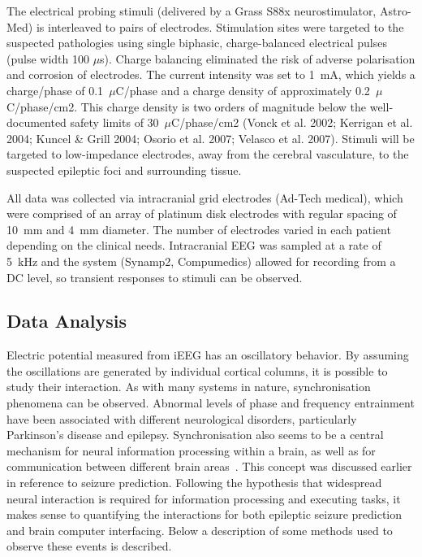 \documentclass[]{article}
\begin{document}
The electrical probing stimuli (delivered by a Grass S88x neurostimulator, Astro-Med) is interleaved to pairs of electrodes. Stimulation sites were targeted to the suspected pathologies using single biphasic, charge-balanced electrical pulses (pulse width 100 $\mu$s). Charge balancing eliminated the risk of adverse polarisation and corrosion of electrodes. The current intensity was set to 1~mA, which yields a charge/phase of 0.1~$\mu$C/phase and a charge density of approximately 0.2~$\mu$C/phase/cm2. This charge density is two orders of magnitude below the well-documented safety limits of 30~$\mu$C/phase/cm2 (Vonck et al. 2002; Kerrigan et al. 2004; Kuncel \& Grill 2004; Osorio et al. 2007; Velasco et al. 2007). Stimuli will be targeted to low-impedance electrodes, away from the cerebral vasculature, to the suspected epileptic foci and surrounding tissue.

All data was collected via intracranial grid electrodes (Ad-Tech medical), which were comprised of an array of platinum disk electrodes with regular spacing of 10~mm and 4~mm diameter. The number of electrodes varied in each patient depending on the clinical needs. Intracranial EEG was sampled at a rate of 5~kHz and the system (Synamp2, Compumedics) allowed for recording from a DC level, so transient responses to stimuli can be observed.
\subsection{Data Analysis}
Electric potential measured from iEEG has
an oscillatory behavior. By assuming the oscillations are generated
by individual cortical columns, it is possible to study their
interaction. As with many systems in nature, synchronisation
phenomena can be observed. Abnormal levels of phase and frequency
entrainment have been associated with different neurological
disorders, particularly Parkinson's disease and epilepsy.
Synchronisation also seems to be a central mechanism for neural
information processing within a brain, as well as for communication
between different brain areas~\cite{Rosenblum2001}. This concept
was discussed earlier in reference to seizure prediction. Following
the hypothesis that widespread neural interaction is required for
information processing and executing tasks, it makes sense to
quantifying the interactions for both epileptic seizure prediction
and brain computer interfacing. Below a description of some methods
used to observe these events is described.\\
\end{document}
